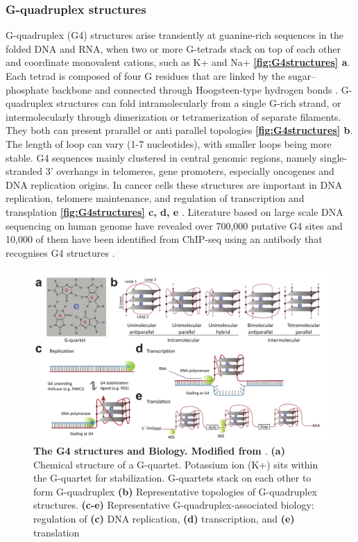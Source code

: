  \subsubsection{G-quadruplex structures}
G-quadruplex (G4) structures arise transiently at guanine-rich sequences in the folded DNA and RNA, when two or more G-tetrads stack on top of each other and coordinate monovalent cations, such as K+ and Na+ \cite{sen1990sodium} \textbf{\autoref{fig:G4structures} a}. Each tetrad is composed of four G residues that are linked by the sugar–phosphate backbone and connected through Hoogsteen-type hydrogen bonds \cite{kwok2017g}. G-quadruplex structures can fold intramolecularly from a single G-rich strand, or intermolecularly through dimerization or tetramerization of separate filaments. They both can present prarallel or anti parallel topologies \textbf{\autoref{fig:G4structures} b}. The length of loop can vary (1-7 nucleotides), with smaller loops being more stable\cite{huppert2010structure}.
G4 sequences mainly clustered in central genomic regions, namely single-stranded 3’ overhangs in telomeres, gene promoters, especially oncogenes and DNA replication origins. In cancer cells these structures are important in DNA replication, telomere maintenance, and regulation of transcription and transplation \textbf{\autoref{fig:G4structures} c, d, e} \cite{rhodes2015g, maizels2013g4}. Literature based on large scale DNA sequencing on human genome have revealed over 700,000 putative G4 sites and 10,000 of them have been identified from ChIP-seq using an antibody that recognises G4 structures \cite{siddiqui2002direct, granotier2005preferential, chambers2015high, hansel2016g}.

 \begin{figure}
\centering
\includegraphics[width=\textwidth]{Figures/G4structures.pdf}
	\caption[The G4 structures and their biology]
	{\small
	    \textbf{The G4 structures and Biology. Modified from \cite{kwok2017g}}.
	   \textbf{(a)} Chemical structure of a G-quartet. Potassium ion (K+) sits within the G-quartet for stabilization. G-quartets stack on each other to form G-quadruplex \textbf{(b)} Representative topologies of G-quadruplex structures. \textbf{(c-e)} Representative G-quadruplex-associated biology: regulation of \textbf{(c)} DNA replication, \textbf{(d)} transcription, and \textbf{(e)} translation
	}
	\label{fig:G4structures}
\end{figure}
 
